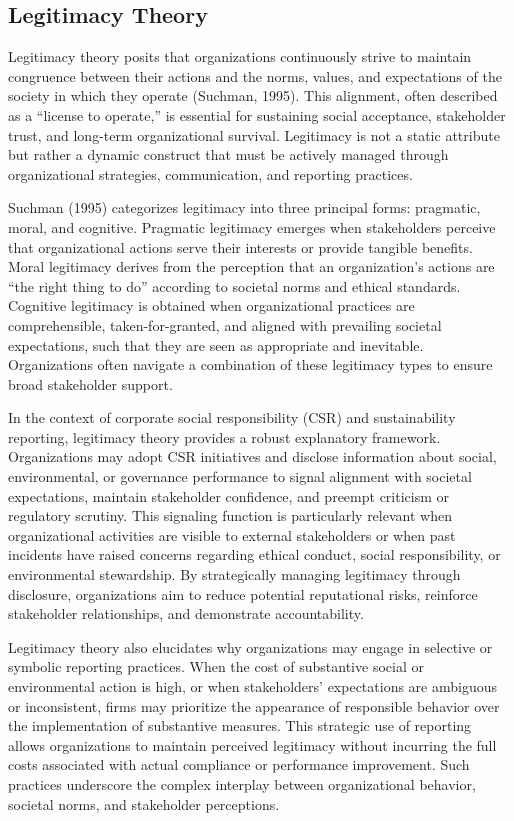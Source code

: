 \subsection{Legitimacy Theory}

Legitimacy theory posits that organizations continuously strive to maintain congruence between their actions 
and the norms, values, and expectations of the society in which they operate (Suchman, 1995). This alignment, 
often described as a “license to operate,” is essential for sustaining social acceptance, stakeholder trust, 
and long-term organizational survival. Legitimacy is not a static attribute but rather a dynamic construct 
that must be actively managed through organizational strategies, communication, and reporting practices.

Suchman (1995) categorizes legitimacy into three principal forms: pragmatic, moral, and cognitive. 
Pragmatic legitimacy emerges when stakeholders perceive that organizational actions serve their interests 
or provide tangible benefits. Moral legitimacy derives from the perception that an organization’s actions 
are “the right thing to do” according to societal norms and ethical standards. Cognitive legitimacy is obtained 
when organizational practices are comprehensible, taken-for-granted, and aligned with prevailing societal 
expectations, such that they are seen as appropriate and inevitable. Organizations often navigate a combination 
of these legitimacy types to ensure broad stakeholder support.

In the context of corporate social responsibility (CSR) and sustainability reporting, legitimacy theory provides 
a robust explanatory framework. Organizations may adopt CSR initiatives and disclose information about social, 
environmental, or governance performance to signal alignment with societal expectations, maintain stakeholder 
confidence, and preempt criticism or regulatory scrutiny. This signaling function is particularly relevant 
when organizational activities are visible to external stakeholders or when past incidents have raised concerns 
regarding ethical conduct, social responsibility, or environmental stewardship. By strategically managing legitimacy 
through disclosure, organizations aim to reduce potential reputational risks, reinforce stakeholder relationships, 
and demonstrate accountability.

Legitimacy theory also elucidates why organizations may engage in selective or symbolic reporting practices. 
When the cost of substantive social or environmental action is high, or when stakeholders’ expectations are 
ambiguous or inconsistent, firms may prioritize the appearance of responsible behavior over the implementation 
of substantive measures. This strategic use of reporting allows organizations to maintain perceived legitimacy 
without incurring the full costs associated with actual compliance or performance improvement. Such practices 
underscore the complex interplay between organizational behavior, societal norms, and stakeholder perceptions.

